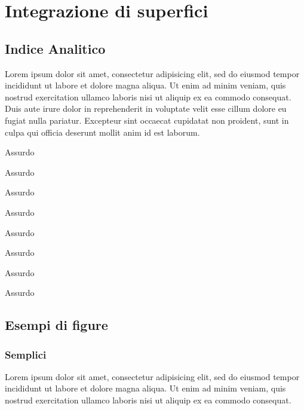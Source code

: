 \documentclass[a4paper, 12pt]{report}
\begin{document}
\chapter{Integrazione di superfici}


\newpage

\section{Indice Analitico}

Lorem ipsum dolor sit amet, consectetur adipisicing elit, sed do eiusmod
tempor incididunt ut labore et dolore magna aliqua. Ut enim ad minim veniam,
quis nostrud exercitation ullamco laboris nisi ut aliquip ex ea commodo
consequat. Duis aute irure dolor in reprehenderit in voluptate velit esse
cillum dolore eu fugiat nulla pariatur. Excepteur sint occaecat cupidatat non
proident, sunt in culpa qui officia deserunt mollit anim id est laborum.

\begin{multicols*}{2}

\makebox[3cm][l]{\absurd} Assurdo

\makebox[3cm][l]{\absurd} Assurdo

\makebox[3cm][l]{\absurd} Assurdo

\makebox[3cm][l]{\absurd} Assurdo

\vfill\null\columnbreak

\makebox[3cm][l]{\absurd} Assurdo

\makebox[3cm][l]{\absurd} Assurdo

\makebox[3cm][l]{\absurd} Assurdo

\makebox[3cm][l]{\absurd} Assurdo

\end{multicols*}

\section*{Esempi di figure}

\subsection*{Semplici}

Lorem ipsum dolor sit amet, consectetur adipisicing elit, sed do eiusmod
tempor incididunt ut labore et dolore magna aliqua. Ut enim ad minim veniam,
quis nostrud exercitation ullamco laboris nisi ut aliquip ex ea commodo consequat.
\end{document}
